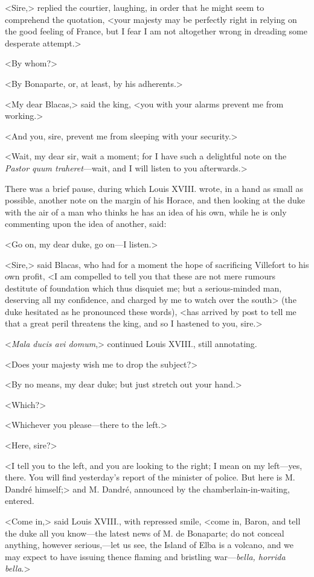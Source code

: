  <Sire,> replied the courtier, laughing, in order that he might seem to comprehend the quotation, <your majesty may be perfectly right in relying on the good feeling of France, but I fear I am not altogether wrong in dreading some desperate attempt.> 

 <By whom?> 

 <By Bonaparte, or, at least, by his adherents.> 

 <My dear Blacas,> said the king, <you with your alarms prevent me from working.> 

 <And you, sire, prevent me from sleeping with your security.> 

 <Wait, my dear sir, wait a moment; for I have such a delightful note on the \textit{Pastor quum traheret}—wait, and I will listen to you afterwards.> 

 There was a brief pause, during which Louis XVIII. wrote, in a hand as small as possible, another note on the margin of his Horace, and then looking at the duke with the air of a man who thinks he has an idea of his own, while he is only commenting upon the idea of another, said: 

 <Go on, my dear duke, go on—I listen.> 

 <Sire,> said Blacas, who had for a moment the hope of sacrificing Villefort to his own profit, <I am compelled to tell you that these are not mere rumours destitute of foundation which thus disquiet me; but a serious-minded man, deserving all my confidence, and charged by me to watch over the south> (the duke hesitated as he pronounced these words), <has arrived by post to tell me that a great peril threatens the king, and so I hastened to you, sire.> 

 <\textit{Mala ducis avi domum},> continued Louis XVIII., still annotating. 

 <Does your majesty wish me to drop the subject?> 

 <By no means, my dear duke; but just stretch out your hand.> 

 <Which?> 

 <Whichever you please—there to the left.> 

 <Here, sire?> 

 <I tell you to the left, and you are looking to the right; I mean on my left—yes, there. You will find yesterday's report of the minister of police. But here is M. Dandré himself;> and M. Dandré, announced by the chamberlain-in-waiting, entered. 

 <Come in,> said Louis XVIII., with repressed smile, <come in, Baron, and tell the duke all you know—the latest news of M. de Bonaparte; do not conceal anything, however serious,—let us see, the Island of Elba is a volcano, and we may expect to have issuing thence flaming and bristling war—\textit{bella, horrida bella}.> 

